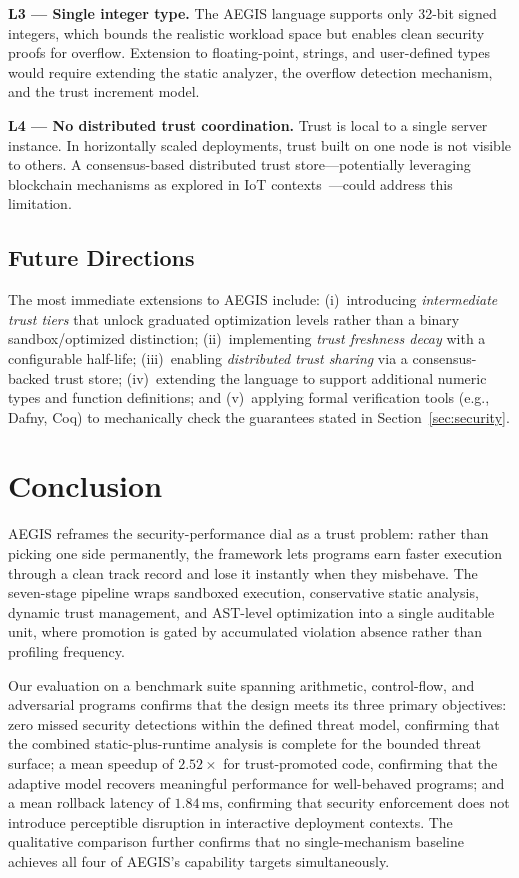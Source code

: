 \documentclass[conference]{IEEEtran}
\begin{document}
\textbf{L3 — Single integer type.} The AEGIS language supports only
32-bit signed integers, which bounds the realistic workload space
but enables clean security proofs for overflow. Extension to
floating-point, strings, and user-defined types would require
extending the static analyzer, the overflow detection mechanism,
and the trust increment model.

\textbf{L4 — No distributed trust coordination.} Trust is local to
a single server instance. In horizontally scaled deployments, trust
built on one node is not visible to others. A consensus-based
distributed trust store—potentially leveraging blockchain
mechanisms as explored in IoT
contexts~\cite{ullah2024deeptrust,fernandez2024sla}—could address
this limitation.

\subsection{Future Directions}

The most immediate extensions to AEGIS include: (i)~introducing
\emph{intermediate trust tiers} that unlock graduated optimization
levels rather than a binary sandbox/optimized distinction;
(ii)~implementing \emph{trust freshness decay} with a configurable
half-life; (iii)~enabling \emph{distributed trust sharing} via a
consensus-backed trust store; (iv)~extending the language to
support additional numeric types and function definitions; and
(v)~applying formal verification tools (e.g., Dafny, Coq) to
mechanically check the guarantees stated in Section~\ref{sec:security}.

\section{Conclusion}
\label{sec:conc}

AEGIS reframes the security-performance dial as a trust problem:
rather than picking one side permanently, the framework lets
programs earn faster execution through a clean track record and
lose it instantly when they misbehave. The seven-stage pipeline
wraps sandboxed execution, conservative static analysis, dynamic
trust management, and AST-level optimization into a single
auditable unit, where promotion is gated by accumulated violation
absence rather than profiling frequency.

Our evaluation on a benchmark suite spanning arithmetic,
control-flow, and adversarial programs confirms
that the design meets its three primary objectives: zero missed
security detections within the defined threat model, confirming that
the combined static-plus-runtime analysis is complete for the
bounded threat surface; a mean speedup of $2.52\times$ for
trust-promoted code, confirming that the adaptive model recovers
meaningful performance for well-behaved programs; and a mean
rollback latency of $1.84\,\text{ms}$, confirming that security
enforcement does not introduce perceptible disruption in interactive
deployment contexts. The qualitative comparison further confirms
that no single-mechanism baseline achieves all four of AEGIS's
capability targets simultaneously.
\end{document}
